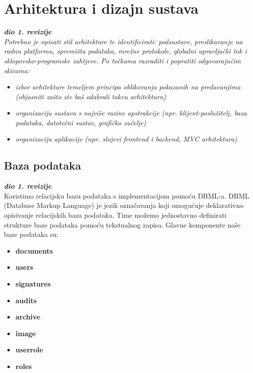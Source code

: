 \chapter{Arhitektura i dizajn sustava}
		
		\textbf{\textit{dio 1. revizije}}\\

		\textit{ Potrebno je opisati stil arhitekture te identificirati: podsustave, preslikavanje na radnu platformu, spremišta podataka, mrežne protokole, globalni upravljački tok i sklopovsko-programske zahtjeve. Po točkama razraditi i popratiti odgovarajućim skicama:}
	\begin{itemize}
		\item 	\textit{izbor arhitekture temeljem principa oblikovanja pokazanih na predavanjima (objasniti zašto ste baš odabrali takvu arhitekturu)}
		\item 	\textit{organizaciju sustava s najviše razine apstrakcije (npr. klijent-poslužitelj, baza podataka, datotečni sustav, grafičko sučelje)}
		\item 	\textit{organizaciju aplikacije (npr. slojevi frontend i backend, MVC arhitektura) }		
	\end{itemize}

	
		

		

				
		\section{Baza podataka}
			
			\textbf{\textit{dio 1. revizije}}\\
			
		{Koristimo relacijsku bazu podataka s implementacijom pomoću DBML-a. DBML (Database Markup Language) je jezik označavanja koji omogućuje deklarativno opisivanje relacijskih baza podataka. Time možemo jednostavno definirati strukture baze podataka pomoću tekstualnog zapisa. Glavne komponente naše baze podataka su:}
				\begin{itemize}
					\item 	\textbf{documents}
					\item 	\textbf{users}
					\item 	\textbf{signatures}
					\item 	\textbf{audits}
					\item 	\textbf{archive}
					\item 	\textbf{image}
					\item 	\textbf{user\textunderscore role}
					\item	\textbf{roles}
				\end{itemize}
		

